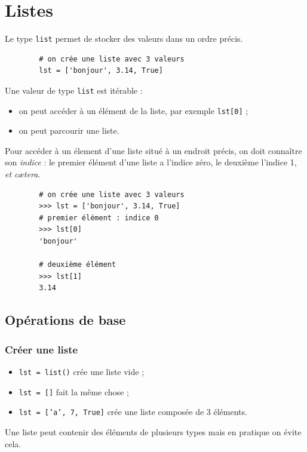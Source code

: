 \chapter{Listes}
\label{ch:listes}
Le type \texttt{list} permet de stocker des valeurs dans un ordre précis.
\begin{pyc}
	\begin{verbatim}
		# on crée une liste avec 3 valeurs
		lst = ['bonjour', 3.14, True]
	\end{verbatim}
\end{pyc}
Une valeur de type \texttt{list} est itérable :
\begin{itemize}
	\item on peut accéder à un élément de la liste, par exemple \texttt{lst[0]} ;
	\item on peut parcourir une liste.
\end{itemize}

Pour accéder à un élement d'une liste situé à un endroit précis, on doit connaître son \textit{indice} : le premier élément d'une liste a l'indice zéro, le deuxième l'indice 1, \textit{et cætera}.

\begin{pyc}
	\begin{verbatim}
		# on crée une liste avec 3 valeurs
		>>> lst = ['bonjour', 3.14, True]
		# premier élément : indice 0
		>>> lst[0]
		'bonjour'

		# deuxième élément
		>>> lst[1] 
		3.14
	\end{verbatim}
\end{pyc}

\section{Opérations de base}

\subsection{Créer une liste}

\begin{itemize}
	\item \texttt{lst = list()} crée une liste vide ;
	\item \texttt{lst = []} fait la même chose ;
	\item  \texttt{lst = ['a', 7, True]} crée une liste composée de 3 éléments.
\end{itemize}
Une liste peut contenir des éléments de plusieurs types mais en pratique on évite cela.


